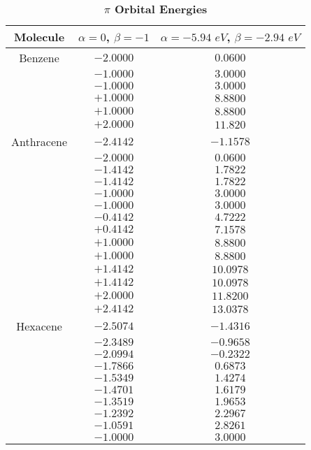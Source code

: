 \documentclass[9pt,twocolumn,twoside]{optica}
\begin{document}
\begin{table}[H]
\centering
\caption{\bf  $\pi$ Orbital Energies }
\begin{tabular}{ccc}
\hline
Molecule &$\alpha=0 $, $\beta=-1 $  & $\alpha=-5.94 \,\, eV $, $\beta=-2.94 \,\, eV $ \\
\hline
Benzene & $-2.0000 $ & $ 0.0600$\\ 
&   $-1.0000$        & $3.0000$\\
&   $-1.0000$        & $3.0000$\\
&   $+1.0000$        & $8.8800$\\
&   $+1.0000$        & $8.8800$\\
&   $+2.0000$        & $11.820$\\
Anthracene 	&   $-2.4142 $ 	      & $-1.1578 $\\ 
		&   $-2.0000 $        & $ 0.0600 $\\
		&   $-1.4142 $        & $ 1.7822 $\\
		&   $-1.4142 $        & $ 1.7822 $\\
		&   $-1.0000 $        & $ 3.0000 $\\
		&   $-1.0000 $        & $ 3.0000 $\\
		&   $-0.4142 $        & $ 4.7222 $\\ 
		&   $+0.4142 $        & $ 7.1578 $\\
		&   $+1.0000 $        & $ 8.8800 $\\
		&   $+1.0000 $        & $ 8.8800 $\\
		&   $+1.4142 $        & $10.0978 $\\
		&   $+1.4142 $        & $10.0978 $\\
		&   $+2.0000 $ 	      & $11.8200 $\\ 
		&   $+2.4142 $        & $13.0378 $\\
Hexacene	&   $-2.5074 $        & $-1.4316 $\\
		&   $-2.3489 $        & $-0.9658 $\\
		&   $-2.0994 $        & $-0.2322 $\\ 
		&   $-1.7866 $        & $ 0.6873 $\\
		&   $-1.5349 $        & $ 1.4274 $\\
		&   $-1.4701 $        & $ 1.6179 $\\
		&   $-1.3519 $        & $ 1.9653 $\\
		&   $-1.2392 $        & $ 2.2967 $\\
		&   $-1.0591 $        & $ 2.8261 $\\
		&   $-1.0000 $        & $ 3.0000 $\\

\end{tabular}
\end{table}
\end{document}
